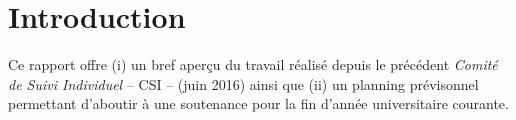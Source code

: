 
\section*{Introduction}

  Ce rapport offre (i) un bref aperçu du travail réalisé depuis le précédent
  \emph{Comité de Suivi Individuel} -- CSI -- (juin 2016) ainsi que (ii) un
  planning prévisonnel permettant d'aboutir à une soutenance pour la fin
  d'année universitaire courante.


